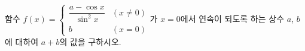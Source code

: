 함수 $f(x)=\begin{cases}\dfrac{a-\cos x}{\sin^2 x} & (x\ne 0)\\[1ex] b & (x=0)\end{cases}$가 $x=0$에서 연속이 되도록 하는 상수 $a$, $b$에 대하여 $a+b$의 값을 구하시오.
